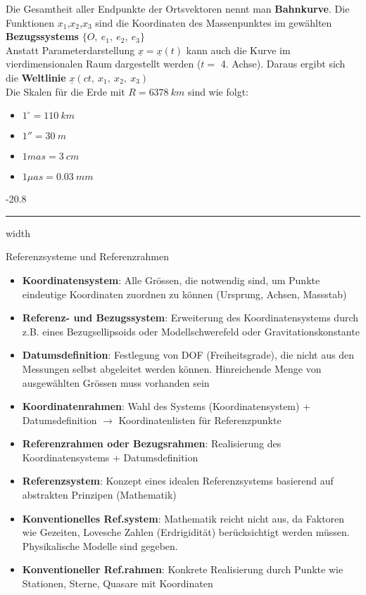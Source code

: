 \documentclass[9pt, landscape, fleqn]{scrartcl}
\makeatletter
\renewcommand{\subsubsection}{\@startsection{subsubsection}{1}{0mm}%
{-2\baselineskip}{0.8\baselineskip}%
{\hrule depth 0.2pt width\columnwidth\vspace*{1.2em}\normalsize\bfseries\rmfamily}}
\makeatother
\begin{document}
\begin{multicols*}{3}
Die Gesamtheit aller Endpunkte der Ortsvektoren nennt man \textbf{Bahnkurve}. Die Funktionen $x_1$,$x_2$,$x_3$ sind die Koordinaten des Massenpunktes im gewählten \textbf{Bezugssystems} $\{O,~e_1,~e_2,~e_3\}$ \\

Anstatt Parameterdarstellung $\underline{x}=\underline{x}(t)$ kann auch die Kurve im vierdimensionalen Raum dargestellt werden ($t =$ 4. Achse). Daraus ergibt sich die \textbf{Weltlinie} $\underline{x}(ct,~x_1,~x_2,~x_3)$ \\

Die Skalen für die Erde mit $R=6378~km$ sind wie folgt:

\begin{itemize}
    \item $1^\circ = 110~km$ 
    \item $1'' = 30~m$
    \item $1 mas = 3~cm$
    \item $1 \mu as = 0.03~mm$
\end{itemize}

\subsubsection{Referenzsysteme und Referenzrahmen}

\begin{itemize}
    \item \textbf{Koordinatensystem}: Alle Grössen, die notwendig sind, um Punkte eindeutige Koordinaten zuordnen zu können (Ursprung, Achsen, Massstab)
    \item \textbf{Referenz- und Bezugssystem}: Erweiterung des Koordinatensystems durch z.B. eines Bezugsellipsoids oder Modellschwerefeld oder Gravitationskonstante
    \item \textbf{Datumsdefinition}: Festlegung von DOF (Freiheitsgrade), die nicht aus den Messungen selbst abgeleitet werden können. Hinreichende Menge von ausgewählten Grössen muss vorhanden sein 
    \item \textbf{Koordinatenrahmen}: Wahl des Systems (Koordinatensystem) + Datumsdefinition $\rightarrow$ Koordinatenlisten für Referenzpunkte
    \item \textbf{Referenzrahmen oder Bezugsrahmen}: Realisierung des Koordinatensystems + Datumsdefinition
    \item \textbf{Referenzsystem}: Konzept eines idealen Referenzsystems basierend auf abstrakten Prinzipen (Mathematik)
    \item \textbf{Konventionelles Ref.system}: Mathematik reicht nicht aus, da Faktoren wie Gezeiten, Lovesche Zahlen (Erdrigidität) berücksichtigt werden müssen. Physikalische Modelle sind gegeben.
    \item \textbf{Konventioneller Ref.rahmen}: Konkrete Realisierung durch Punkte wie Stationen, Sterne, Quasare mit Koordinaten
\end{itemize}


\end{multicols*}
\end{document}
